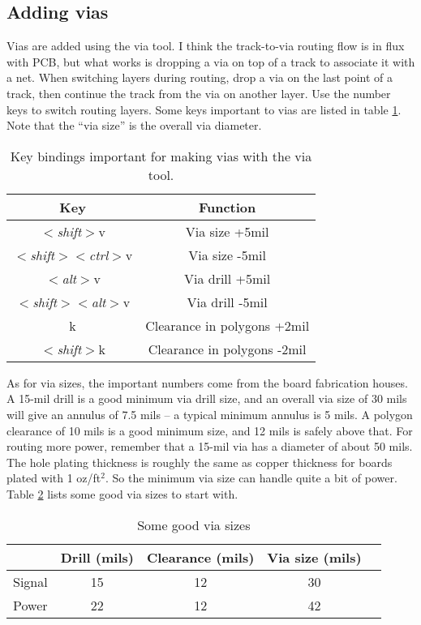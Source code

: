 \subsection{Adding vias}
Vias are added using the via tool.  I think the track-to-via routing flow is in flux with PCB, but what works is dropping a via on top of a track to associate it with a net.  When switching layers during routing, drop a via on the last point of a track, then continue the track from the via on another layer.  Use the number keys to switch routing layers.  Some keys important to vias are listed in table \ref{via_keys}.  Note that the ``via size'' is the overall via diameter.
\begin{table}[htb]
\begin{center}
\begin{tabular}{|c|c|}\hline \hline
Key	&Function \\ \hline

$<$\textsl{shift}$>$v				&\parbox[c][1.5\height][c]{5cm}{Via size +5mil}\\ \hline
$<$\textsl{shift}$>$$<$\textsl{ctrl}$>$v	&\parbox[c][1.5\height][c]{5cm}{Via size -5mil}\\ \hline
$<$\textsl{alt}$>$v				&\parbox[c][1.5\height][c]{5cm}{Via drill +5mil}\\ \hline
$<$\textsl{shift}$>$$<$\textsl{alt}$>$v		&\parbox[c][1.5\height][c]{5cm}{Via drill -5mil}\\ \hline
k						&\parbox[c][1.5\height][c]{5cm}{Clearance in polygons +2mil}\\ \hline
$<$\textsl{shift}$>$k				&\parbox[c][1.5\height][c]{5cm}{Clearance in polygons -2mil}\\ \hline
\end{tabular}
\end{center}
\caption{Key bindings important for making vias with the via tool.\label{via_keys}}
\end{table}

As for via sizes, the important numbers come from the board fabrication houses.  A 15-mil drill is a good minimum via drill size, and an overall via size of 30 mils will give an annulus of 7.5 mils -- a typical minimum annulus is 5 mils.  A polygon clearance of 10 mils is a good minimum size, and 12 mils is safely above that.  For routing more power, remember that a 15-mil via has a diameter of about 50 mils.  The hole plating thickness is roughly the same as copper thickness for boards plated with 1 oz/ft$^2$.  So the minimum via size can handle quite a bit of power.  Table \ref{via_sizes} lists some good via sizes to start with.
\begin{table}[htb]
\begin{center}
\begin{tabular}{|c|c|c|c|c|}\hline
	&Drill (mils)	&Clearance (mils)	&Via size (mils)\\ \hline \hline
Signal	&15		&12			&30\\ \hline
Power	&22		&12			&42\\ \hline
\end{tabular}
\end{center}
\caption{Some good via sizes\label{via_sizes}}
\end{table}

